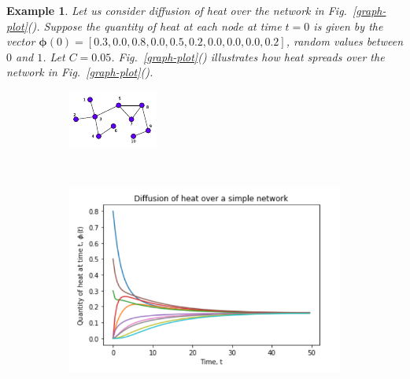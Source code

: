 \documentclass[10pt,a4paper]{article}
\newtheorem{exa}{Example}
\begin{document}
    	 \begin{exa} Let us consider diffusion of heat over the network in Fig.~\ref{graph-plot}(). Suppose the quantity of heat at each node at time $t=0$ is given by the vector $\boldsymbol{\phi}(0)= [0.3,0.0,0.8,0.0,0.5,0.2,0.0,0.0,0.0,0.2]$, random values between $0$ and $1$. Let $C=0.05$. Fig.~\ref{graph-plot}() illustrates how heat spreads over the network in Fig.~\ref{graph-plot}(). 
    	 	
    	 	\begin{figure}[!h]
    	 		\centering
    	 		\begin{subfigure}[b]{0.29\textwidth}
    	 			\includegraphics[width=\textwidth]{images/diffusion-graph.pdf}
    	 			\caption{}
    	 			\label{difn-graph}
    	 		\end{subfigure}~
    	 		\begin{subfigure}[b]{0.45\textwidth}
    	 			\includegraphics[width= \textwidth]{images/Diffusion-on-network-new.png}

\end{subfigure}
\end{figure}
\end{exa}
\end{document}
